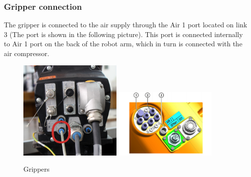 	\subsubsection{Gripper connection}
	The gripper is connected to the air supply through the Air 1 port located on link 3 (The port is shown in the following picture). This port is connected internally to Air 1 port on the back of the robot arm, which in turn is connected with the air compressor.
\begin{figure}[H]
    \centering
    \includegraphics[width=0.45\textwidth]{figures/gripper1}
    \includegraphics[width=0.45\textwidth,height=0.3\textheight]{figures/gripper2}
    \caption{Grippers}
    \label{fig:grippers}
\end{figure}

